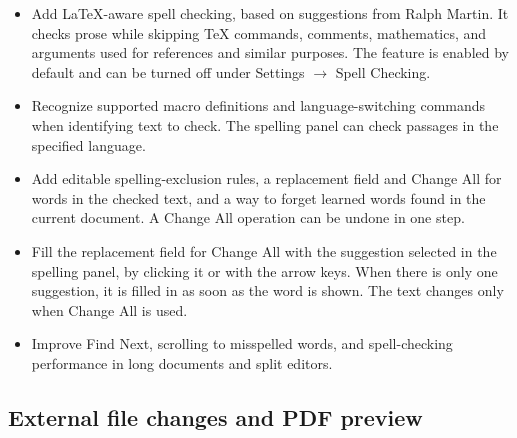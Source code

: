 \documentclass[11pt,letterpaper]{article}
\begin{document}
\begin{itemize}
\item Add LaTeX-aware spell checking, based on suggestions from Ralph Martin. It checks prose while skipping TeX commands, comments, mathematics, and arguments used for references and similar purposes. The feature is enabled by default and can be turned off under Settings \(\rightarrow\) Spell Checking.
\item Recognize supported macro definitions and language-switching commands when identifying text to check. The spelling panel can check passages in the specified language.
\item Add editable spelling-exclusion rules, a replacement field and Change All for words in the checked text, and a way to forget learned words found in the current document. A Change All operation can be undone in one step.
\item Fill the replacement field for Change All with the suggestion selected in the spelling panel, by clicking it or with the arrow keys. When there is only one suggestion, it is filled in as soon as the word is shown. The text changes only when Change All is used.
\item Improve Find Next, scrolling to misspelled words, and spell-checking performance in long documents and split editors.
\end{itemize}

\subsection{External file changes and PDF preview}
\end{document}
